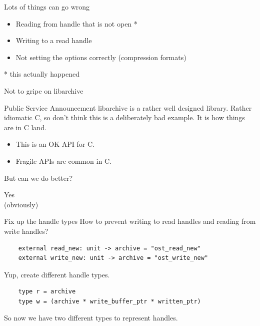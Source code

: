 \documentclass{beamer}
\renewcommand{\example}[1]{{\usebeamercolor[fg]{example text} #1}}
\begin{document}
\begin{frame}{Lots of things can go wrong}
  \begin{itemize}
    \item Reading from handle that is not open *
    \item Writing to a read handle
    \item Not setting the options correctly (compression formats)
  \end{itemize}
  \pause
  * this actually happened
\end{frame}

\begin{frame}{Not to gripe on libarchive}
  \begin{exampleblock}{Public Service Announcement}
    libarchive is a rather well designed library. Rather idiomatic C, so don't
    think this is a deliberately bad example. It is how things are in C land.
  \end{exampleblock}

  \begin{itemize}
    \item This is an OK API for C.
    \item Fragile APIs are common in C.
  \end{itemize}

  \vspace{2ex}
  \pause
  \begin{center}
    {\Large But can we do better?}
  \end{center}
\end{frame}

\begin{frame}
  \begin{center}
    {\Huge \example{Yes}}\\
    \pause
    {\scriptsize (obviously)}
  \end{center}
\end{frame}

\begin{frame}[fragile]{Fix up the handle types}
  How to prevent writing to read handles and reading from write handles?
  \begin{verbatim}
    external read_new: unit -> archive = "ost_read_new"
    external write_new: unit -> archive = "ost_write_new"
  \end{verbatim}
  \pause
  Yup, create different handle types.
  \begin{verbatim}
    type r = archive
    type w = (archive * write_buffer_ptr * written_ptr)
  \end{verbatim}
  So now we have two different types to represent handles.
\end{frame}
\end{document}
